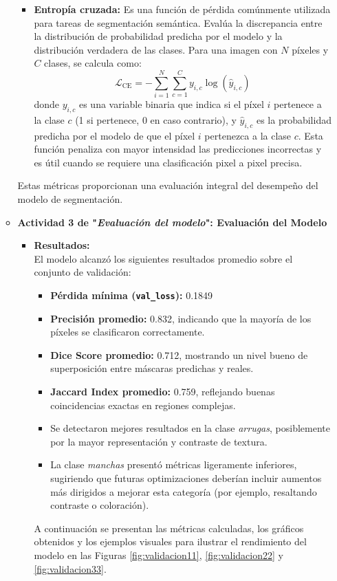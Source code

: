 \begin{enumerate}
\begin{itemize}
\begin{itemize}
  \item \textbf{Entropía cruzada:} Es una función de pérdida comúnmente utilizada para tareas de segmentación semántica. Evalúa la discrepancia entre la distribución de probabilidad predicha por el modelo y la distribución verdadera de las clases. Para una imagen con $N$ píxeles y $C$ clases, se calcula como:
$$\mathcal{L}_{\text{CE}} = -\sum_{i=1}^{N} \sum_{c=1}^{C} y_{i,c} \log(\hat{y}_{i,c})$$
donde $y_{i,c}$ es una variable binaria que indica si el píxel $i$ pertenece a la clase $c$ (1 si pertenece, 0 en caso contrario), y $\hat{y}_{i,c}$ es la probabilidad predicha por el modelo de que el píxel $i$ pertenezca a la clase $c$. Esta función penaliza con mayor intensidad las predicciones incorrectas y es útil cuando se requiere una clasificación pixel a pixel precisa.
\end{itemize}

Estas métricas proporcionan una evaluación integral del desempeño del modelo de segmentación.



  \item\textbf{Actividad 3 de "\textit{Evaluación del modelo}": Evaluación del Modelo}
  \begin{itemize}
    \item \textbf{Resultados:}\\
El modelo alcanzó los siguientes resultados promedio sobre el conjunto de validación:
\begin{itemize}
  \item \textbf{Pérdida mínima (\texttt{val\_loss}):} 0.1849 
  \item \textbf{Precisión promedio:} 0.832, indicando que la mayoría de los píxeles se clasificaron correctamente.
  \item \textbf{Dice Score promedio:} 0.712, mostrando un nivel bueno de superposición entre máscaras predichas y reales.
  \item \textbf{Jaccard Index promedio:} 0.759, reflejando buenas coincidencias exactas en regiones complejas.
  \item Se detectaron mejores resultados en la clase \emph{arrugas}, posiblemente por la mayor representación y contraste de textura.
  \item La clase \emph{manchas} presentó métricas ligeramente inferiores, sugiriendo que futuras optimizaciones deberían incluir aumentos más dirigidos a mejorar esta categoría (por ejemplo, resaltando contraste o coloración).
\end{itemize}
  A continuación se presentan las métricas calculadas, los gráficos obtenidos y los ejemplos visuales para ilustrar el rendimiento del modelo en las Figuras \ref{fig:validacion11}, \ref{fig:validacion22} y \ref{fig:validacion33}.


\end{itemize}
\end{itemize}
\end{enumerate}
